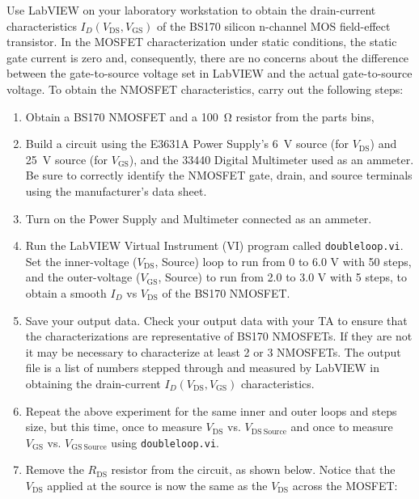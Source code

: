 \documentclass[12pt]{../manual}
\begin{document}
Use LabVIEW on your laboratory workstation to obtain the drain-current characteristics $I_D(V_{\mathrm{DS}}, V_{\mathrm{GS}})$ of the BS170 silicon n-channel MOS field-effect transistor. In the MOSFET characterization under static conditions, the static gate current is zero and, consequently, there are no concerns about the difference between the gate-to-source voltage set in LabVIEW and the actual gate-to-source voltage. To obtain the NMOSFET characteristics, carry out the following steps:
\begin{enumerate}
\item Obtain a BS170 NMOSFET and a \SI{100}{\ohm} resistor from the parts bins,
\item Build a circuit using the E3631A Power Supply's \SI{6}{\volt} source (for $V_{\mathrm{DS}}$) and \SI{+25}{\volt} source (for $V_{\mathrm{GS}}$), and the 33440 Digital Multimeter used as an ammeter. Be sure to correctly identify the NMOSFET gate, drain, and source terminals using the manufacturer's data sheet.
\item Turn on the Power Supply and Multimeter connected as an ammeter.
\item Run the LabVIEW Virtual Instrument (VI) program called {\tt doubleloop.vi}. Set the inner-voltage ($V_{\mathrm{DS}}$, Source) loop to run from 0 to 6.0 V with 50 steps, and the outer-voltage ($V_{\mathrm{GS}}$, Source) to run from 2.0 to 3.0 V with 5 steps, to obtain a smooth $I_D$ vs $V_{\mathrm{DS}}$ of the BS170 NMOSFET.
\item Save your output data. Check your output data with your TA to ensure that the characterizations are representative of BS170 NMOSFETs. If they are not it may be necessary to characterize at least 2 or 3 NMOSFETs. The output file is a list of numbers stepped through and measured by LabVIEW in obtaining the drain-current $I_D(V_{\mathrm{DS}}, V_{\mathrm{GS}})$ characteristics.
\item Repeat the above experiment for the same inner and outer loops and steps size, but this time, once to measure $V_{\mathrm{DS}}$ vs. $V_{\mathrm{DS~Source}}$ and once to measure $V_{\mathrm{GS}}$ vs. $V_{\mathrm{GS~Source}}$ using {\tt doubleloop.vi}.
\item Remove the $R_{\mathrm{DS}}$ resistor from the circuit, as shown below. Notice that the $V_{\mathrm{DS}}$ applied at the source is now the same as the $V_{\mathrm{DS}}$ across the MOSFET:
\end{enumerate}
\end{document}
